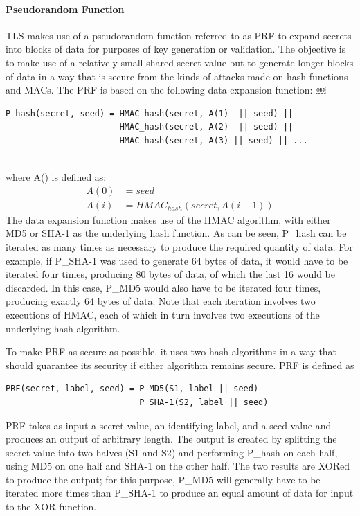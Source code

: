 \documentclass[12pt]{article}
\begin{document}
\paragraph*{Pseudorandom Function}
TLS makes use of a pseudorandom function referred to as PRF to expand secrets into blocks of data for purposes of key generation or validation. The objective is to make use of a relatively small shared secret value but to generate longer blocks of data in a way that is secure from the kinds of attacks made on hash functions and MACs. The PRF is based on the following data expansion function:
￼
\begin{verbatim}
P_hash(secret, seed) = HMAC_hash(secret, A(1)  || seed) ||
                       HMAC_hash(secret, A(2)  || seed) ||
                       HMAC_hash(secret, A(3) || seed) || ...
                       
\end{verbatim}
where A() is defined as:
\begin{align*}
A(0) &= seed\\
A(i) &= HMAC_{hash }(secret, A(i - 1))
\end{align*}
The data expansion function makes use of the HMAC algorithm, with either MD5 or SHA-1 as the underlying hash function. As can be seen, P\_hash can be iterated as many times as necessary to produce the required quantity of data. For example, if P\_SHA-1 was used to generate 64 bytes of data, it would have to be iterated four times, producing 80 bytes of data, of which the last 16 would be discarded. In this case, P\_MD5 would also have to be iterated four times, producing exactly 64 bytes of data. Note that each iteration involves two executions of HMAC, each of which in turn involves two executions of the underlying hash algorithm.

To make PRF as secure as possible, it uses two hash algorithms in a way that should guarantee its security if either algorithm remains secure. PRF is defined as
\begin{verbatim}
PRF(secret, label, seed) = P_MD5(S1, label || seed)
                           P_SHA-1(S2, label || seed)              
\end{verbatim}

PRF takes as input a secret value, an identifying label, and a seed value and produces an output of arbitrary length. The output is created by splitting the secret value into two halves (S1 and S2) and performing P\_hash on each half, using MD5 on one half and SHA-1 on the other half. The two results are XORed to produce the output; for this purpose, P\_MD5 will generally have to be iterated more times than P\_SHA-1 to produce an equal amount of data for input to the XOR function.
\end{document}
